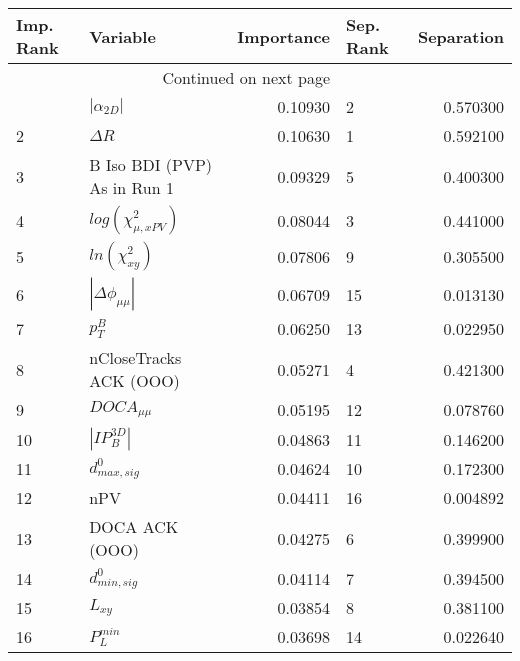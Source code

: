 \usepackage{lscape}

\begin{landscape}
\begin{longtable}{llrlr}
\toprule
Imp. Rank &                     Variable &  Importance & Sep. Rank &  Separation \\
\midrule
\endhead
\midrule
\multicolumn{3}{r}{{Continued on next page}} \\
\midrule
\endfoot

\bottomrule
\endlastfoot
        1 &              $|\alpha_{2D}|$ &     0.10930 &         2 &    0.570300 \\
        2 &                   $\Delta R$ &     0.10630 &         1 &    0.592100 \\
        3 &  B Iso BDI (PVP) As in Run 1 &     0.09329 &         5 &    0.400300 \\
        4 &    $log(\chi^{2}_{\mu,xPV})$ &     0.08044 &         3 &    0.441000 \\
        5 &          $ln(\chi^{2}_{xy})$ &     0.07806 &         9 &    0.305500 \\
        6 &     $|\Delta \phi_{\mu\mu}|$ &     0.06709 &        15 &    0.013130 \\
        7 &                    $p^B_{T}$ &     0.06250 &        13 &    0.022950 \\
        8 &       nCloseTracks ACK (OOO) &     0.05271 &         4 &    0.421300 \\
        9 &              $DOCA_{\mu\mu}$ &     0.05195 &        12 &    0.078760 \\
       10 &              $|IP_{B}^{3D}|$ &     0.04863 &        11 &    0.146200 \\
       11 &             $d^0_{max, sig}$ &     0.04624 &        10 &    0.172300 \\
       12 &                          nPV &     0.04411 &        16 &    0.004892 \\
       13 &               DOCA ACK (OOO) &     0.04275 &         6 &    0.399900 \\
       14 &             $d^0_{min, sig}$ &     0.04114 &         7 &    0.394500 \\
       15 &                     $L_{xy}$ &     0.03854 &         8 &    0.381100 \\
       16 &                $P^{min}_{L}$ &     0.03698 &        14 &    0.022640 \\
\end{longtable}

\end{landscape}
